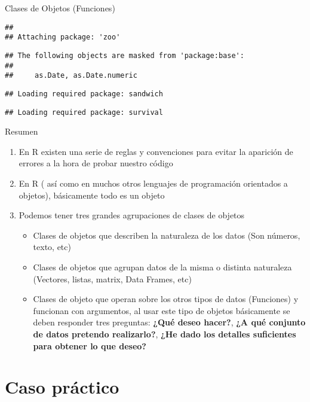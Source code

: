 \documentclass[
  10,
  ignorenonframetext,
]{beamer}
\providecommand{\tightlist}{%
  \setlength{\itemsep}{0pt}\setlength{\parskip}{0pt}}
\begin{document}
\begin{frame}[fragile]{Clases de Objetos (Funciones)}
\begin{verbatim}
## 
## Attaching package: 'zoo'
\end{verbatim}

\begin{verbatim}
## The following objects are masked from 'package:base':
## 
##     as.Date, as.Date.numeric
\end{verbatim}

\begin{verbatim}
## Loading required package: sandwich
\end{verbatim}

\begin{verbatim}
## Loading required package: survival
\end{verbatim}
\end{frame}

\begin{frame}{Resumen}
\protect\hypertarget{resumen}{}
\begin{enumerate}
\tightlist
\item
  En R existen una serie de reglas y convenciones para evitar la
  aparición de errores a la hora de probar nuestro código
\item
  En R ( así como en muchos otros lenguajes de programación orientados a
  objetos), básicamente todo es un objeto
\item
  Podemos tener tres grandes agrupaciones de clases de objetos

  \begin{itemize}
  \tightlist
  \item
    Clases de objetos que describen la naturaleza de los datos (Son
    números, texto, etc)
  \item
    Clases de objetos que agrupan datos de la misma o distinta
    naturaleza (Vectores, listas, matrix, Data Frames, etc)
  \item
    Clases de objeto que operan sobre los otros tipos de datos
    (Funciones) y funcionan con argumentos, al usar este tipo de objetos
    básicamente se deben responder tres preguntas: \textbf{¿Qué deseo
    hacer?}, \textbf{¿A qué conjunto de datos pretendo realizarlo?},
    \textbf{¿He dado los detalles suficientes para obtener lo que
    deseo?}
  \end{itemize}
\end{enumerate}
\end{frame}

\hypertarget{caso-pruxe1ctico}{%
\section{Caso práctico}\label{caso-pruxe1ctico}}
\end{document}

